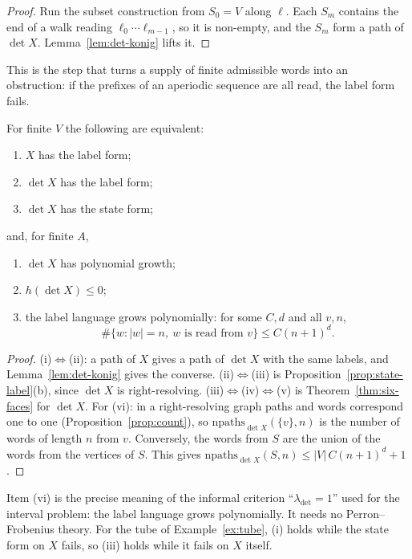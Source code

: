\begin{proof}
Run the subset construction from \(S_0=V\) along \(\ell\). Each \(S_m\) contains the end of a walk
reading \(\ell_0\cdots\ell_{m-1}\), so it is non-empty, and the \(S_m\) form a path of
\(\det X\). Lemma~\ref{lem:det-konig} lifts it.
\end{proof}

This is the step that turns a supply of finite admissible words into an obstruction: if the
prefixes of an aperiodic sequence are all read, the label form fails.

\begin{theorem}[determinization]\label{thm:determinization}
For finite \(V\) the following are equivalent:
\begin{enumerate}[label=(\roman*)]
\item \(X\) has the label form;
\item \(\det X\) has the label form;
\item \(\det X\) has the state form;
\end{enumerate}
and, for finite \(A\),
\begin{enumerate}[label=(\roman*),resume]
\item \(\det X\) has polynomial growth;
\item \(h(\det X)\le 0\);
\item the label language grows polynomially: for some \(C,d\) and all \(v,n\),
  \[\#\{w : |w|=n,\ w\text{ is read from }v\}\le C(n+1)^d.\]
\end{enumerate}
\end{theorem}

\begin{proof}
(i)\(\Leftrightarrow\)(ii): a path of \(X\) gives a path of \(\det X\) with the same labels,
and Lemma~\ref{lem:det-konig} gives the converse. (ii)\(\Leftrightarrow\)(iii) is
Proposition~\ref{prop:state-label}(b), since \(\det X\) is right-resolving.
(iii)\(\Leftrightarrow\)(iv)\(\Leftrightarrow\)(v) is Theorem~\ref{thm:six-faces} for
\(\det X\). For (vi): in a right-resolving graph paths and words correspond one to one
(Proposition~\ref{prop:count}), so \(\mathrm{npaths}_{\det X}(\{v\},n)\) is the number of words
of length \(n\) from \(v\). Conversely, the words from \(S\) are the union of the words from the
vertices of \(S\). This gives \(\mathrm{npaths}_{\det X}(S,n)\le|V|\,C(n+1)^d+1\).
\end{proof}

Item (vi) is the precise meaning of the informal criterion ``\(\lambda_{\det}=1\)'' used for the
interval problem: the label language grows polynomially. It needs no Perron--Frobenius theory.
For the tube of Example~\ref{ex:tube}, (i) holds while the state form on \(X\) fails, so (iii)
holds while it fails on \(X\) itself.

